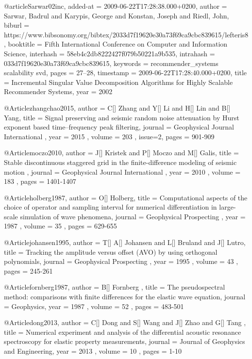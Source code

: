 {@article{Sarwar02inc,
  added-at = {2009-06-22T17:28:38.000+0200},
  author = {Sarwar, Badrul and Karypis, George and Konstan, Joseph and Riedl, John},
  biburl = {https://www.bibsonomy.org/bibtex/2033d7f19620e30a73f69ca9cbc839615/lefteris8},
  booktitle = {Fifth International Conference on Computer and Information Science},
  interhash = {58eb4c2db8222427f079b50221a9b535},
  intrahash = {033d7f19620e30a73f69ca9cbc839615},
  keywords = {recommender_systems scalability svd},
  pages = {27--28},
  timestamp = {2009-06-22T17:28:40.000+0200},
  title = {Incremental Singular Value Decomposition Algorithms for Highly Scalable
	Recommender Systems},
  year = 2002
}

@Article{zhangchao2015,
 author =  {  C[] Zhang and Y[] Li and H[] Lin and B[] Yang},
 title =   {Signal preserving and seismic random noise attenuation by Hurst exponent based time–frequency peak filtering},
 journal = { Geophysical Journal International },
 year =    { 2015 },
 volume =  { 203 },
 issue=2,
 pages =   { 901-909 }
}



@Article{moczo2010,
 author =  {  J[] Kristek and P[] Moczo and M[] Galis},
 title =   {Stable discontinuous staggered grid in the finite-difference modeling of seismic motion },
 journal = { Geophysical Journal International },
 year =    { 2010 },
 volume =  { 183 },
 pages =   { 1401-1407 }
}

@Article{holberg1987,
 author =  { O[] Holberg},
 title =   {Computational aspects of the choice of operator and sampling interval for numerical differentiation in large-scale simulation of wave phenomena},
 journal = { Geophysical Prospecting },
 year =    { 1987 },
 volume =  { 35 },
 pages =   { 629-655 }
}

@Article{johansen1995,
 author =  { T[] A[] Johansen and L[] Bruland and J[] Lutro},
 title =   {Tracking the amplitude versus offset (AVO) by using orthogonal polynomials},
 journal = { Geophysical Prospecting },
 year =    { 1995 },
 volume =  { 43 },
 pages =   { 245-261 }
}

@Article{fornberg1987,
 author =  { B[] Fornberg },
 title =   {The pseudospectral method: comparisons with finite differences for the elastic
wave equation},
 journal = { Geophysics},
 year =    { 1987 },
 volume =  { 52 },
 pages =   { 483-501 }
}

@Article{dong2013,
 author =  { C[] Dong and S[] Wang and J[] Zhao and G[] Tang },
 title =   {Numerical experiment and analysis of the differential acoustic resonance spectroscopy for elastic property measurements},
 journal = { Journal of Geophysics and Engineering},
 year =    { 2013 },
 volume =  { 10 },
 pages =   { 1-10 }
}

}
